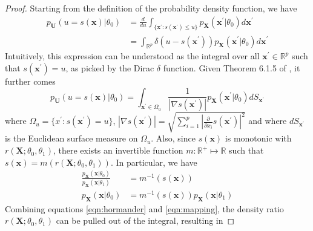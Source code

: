 \documentclass[12pt]{article}
\numberwithin{equation}{section}
\theoremstyle{plain}
\begin{document}
\begin{proof}
Starting from the definition of the probability density function, we have
\begin{align}
p_{\mathbf{U}}(u=s(\mathbf{x})|\theta_0) &= \frac{d}{du}  \int_{\{\mathbf{x}^\prime : s(\mathbf{x}^\prime) \leq u\}} p_\mathbf{X}(\mathbf{x}^\prime|\theta_0) d\mathbf{x}^\prime \nonumber \\
&= \int_{\mathbb{R}^p} \delta(u - s(\mathbf{x}^\prime)) p_\mathbf{X}(\mathbf{x}^\prime|\theta_0) d\mathbf{x}^\prime
\end{align}
Intuitively, this expression can be understood as the integral
over all $\mathbf{x}^\prime \in \mathbb{R}^p$ such that $s(\mathbf{x}^\prime) = u$, as picked
by the Dirac $\delta$ function. Given Theorem 6.1.5 of \citet{Hrmander1990},
it further comes
\begin{equation}
p_{\mathbf{U}}(u=s(\mathbf{x})|\theta_0) = \int_{\mathbf{x}^\prime \in \Omega_u } \frac{1}{|\nabla s(\mathbf{x}^\prime)|} p_\mathbf{X}(\mathbf{x}^\prime|\theta_0) dS_{\mathbf{x}^\prime} \label{eqn:hormander}
\end{equation}
where $\Omega_u = \{x^\prime : s(\mathbf{x}^\prime)=u\}$, $|\nabla s(\mathbf{x}^\prime)| = \sqrt{\sum_{i=1}^p |\frac{\partial}{\partial x_i} s(\mathbf{x}^\prime)|^2}$
and where $dS_{\mathbf{x}^\prime}$ is the Euclidean surface measure on $\Omega_u$.
Also, since $s(\mathbf{x})$ is monotonic with
$r(\mathbf{X}; \theta_0, \theta_1)$,
there exists an invertible function $m:\mathbb{R}^+ \mapsto \mathbb{R}$ such
that $s(\mathbf{x}) = m(r(\mathbf{X}; \theta_0, \theta_1))$.
In particular, we have
\begin{align}
\frac{p_\mathbf{X}(\mathbf{x}|\theta_0)}{p_\mathbf{X}(\mathbf{x}|\theta_1)} &= m^{-1}(s(\mathbf{x})) \nonumber \\
p_\mathbf{X}(\mathbf{x}|\theta_0) &= m^{-1}(s(\mathbf{x})) p_\mathbf{X}(\mathbf{x}|\theta_1) \label{eqn:mapping}
\end{align}
Combining equations \ref{eqn:hormander} and \ref{eqn:mapping}, the density ratio $r(\mathbf{X}; \theta_0, \theta_1)$ can be pulled out of the integral, resulting in

\end{proof}
\end{document}
